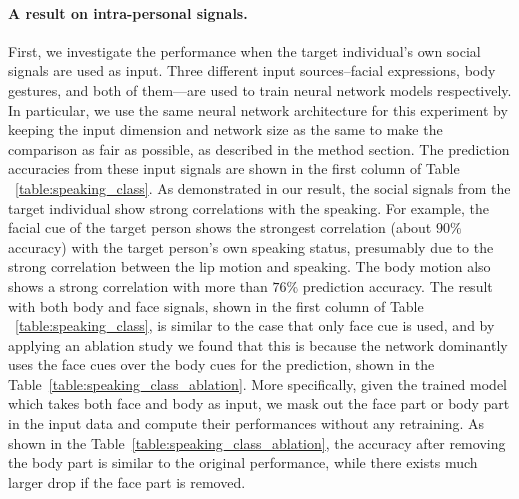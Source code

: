 \paragraph{A result on intra-personal signals.} First, we investigate the performance when the target individual's own social signals are used as input. Three different input sources--facial expressions, body gestures, and both of them---are used to train neural network models respectively. In particular, we use the same neural network architecture for this experiment by keeping the input dimension and network size as the same to make the comparison as fair as possible, as described in the method section. The prediction accuracies from these input signals are shown in the first column of Table ~\ref{table:speaking_class}. As demonstrated in our result, the social signals from the target individual show strong correlations with the speaking. For example, the facial cue of the target person shows the strongest correlation (about $90\%$ accuracy) with the target person's own speaking status, presumably due to the strong correlation between the lip motion and speaking. The body motion also shows a strong correlation with more than $76\%$ prediction accuracy. The result with both body and face signals, shown in the first column of Table ~\ref{table:speaking_class}, is similar to the case that only face cue is used, and by applying an ablation study we found that this is because the network dominantly uses the face cues over the body cues for the prediction, shown in the Table~\ref{table:speaking_class_ablation}. More specifically, given the trained model which takes both face and body as input, we mask out the face part or body part in the input data and compute their performances without any retraining. As shown in the Table~\ref{table:speaking_class_ablation}, the accuracy after removing the body part is similar to the original performance, while there exists much larger drop if the face part is removed. 


